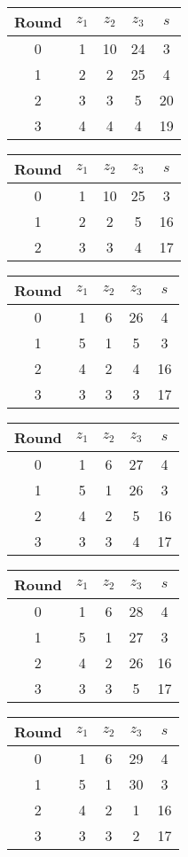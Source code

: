 \begin{tabular}{c | c | c | c | c }
Round & $z_1$ & $z_2$ & $z_3$ & $s$ \\
\hline
0 & 1 & 10 & 24 & 3 \\
1 & 2 & 2 & 25 & 4 \\
2 & 3 & 3 & 5 & 20 \\
3 & 4 & 4 & 4 & 19
\end{tabular}

\begin{tabular}{c | c | c | c | c }
Round & $z_1$ & $z_2$ & $z_3$ & $s$ \\
\hline
0 & 1 & 10 & 25 & 3 \\
1 & 2 & 2 & 5 & 16 \\
2 & 3 & 3 & 4 & 17
\end{tabular}

\begin{tabular}{c | c | c | c | c }
Round & $z_1$ & $z_2$ & $z_3$ & $s$ \\
\hline
0 & 1 & 6 & 26 & 4 \\
1 & 5 & 1 & 5 & 3 \\
2 & 4 & 2 & 4 & 16 \\
3 & 3 & 3 & 3 & 17
\end{tabular}

\begin{tabular}{c | c | c | c | c }
Round & $z_1$ & $z_2$ & $z_3$ & $s$ \\
\hline
0 & 1 & 6 & 27 & 4 \\
1 & 5 & 1 & 26 & 3 \\
2 & 4 & 2 & 5 & 16 \\
3 & 3 & 3 & 4 & 17
\end{tabular}

\begin{tabular}{c | c | c | c | c }
Round & $z_1$ & $z_2$ & $z_3$ & $s$ \\
\hline
0 & 1 & 6 & 28 & 4 \\
1 & 5 & 1 & 27 & 3 \\
2 & 4 & 2 & 26 & 16 \\
3 & 3 & 3 & 5 & 17
\end{tabular}

\begin{tabular}{c | c | c | c | c }
Round & $z_1$ & $z_2$ & $z_3$ & $s$ \\
\hline
0 & 1 & 6 & 29 & 4 \\
1 & 5 & 1 & 30 & 3 \\
2 & 4 & 2 & 1 & 16 \\
3 & 3 & 3 & 2 & 17
\end{tabular}

